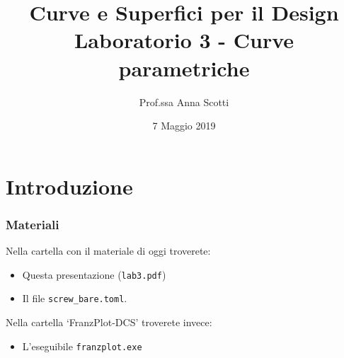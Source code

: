 \documentclass{beamer}
\title[Curve e Sup. - Lab 3]{Curve e Superfici per il Design \\ Laboratorio 3 - Curve parametriche}
\author[Prof.ssa Scotti]{Prof.ssa Anna Scotti}
\date{7 Maggio 2019}
\begin{document}
\begin{frame}
\maketitle
\end{frame}
\section{Introduzione}
\begin{frame}
\frametitle{Materiali}
Nella cartella con il materiale di oggi troverete:
\begin{itemize}
\item Questa presentazione (\texttt{lab3.pdf})
\item Il file \texttt{screw\_bare.toml}.
\end{itemize}
Nella cartella `FranzPlot-DCS' troverete invece:
\begin{itemize}
\item L'eseguibile \texttt{franzplot.exe}
\end{itemize}
\end{frame}
\end{document}
